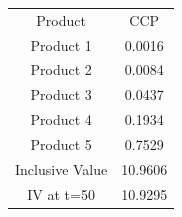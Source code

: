 \begin{tabular}{cc}
Product & CCP \\
Product 1 & 0.0016 \\
Product 2 & 0.0084 \\
Product 3 & 0.0437 \\
Product 4 & 0.1934 \\
Product 5 & 0.7529 \\
Inclusive Value & 10.9606 \\
IV at t=50 & 10.9295 \\
\end{tabular}